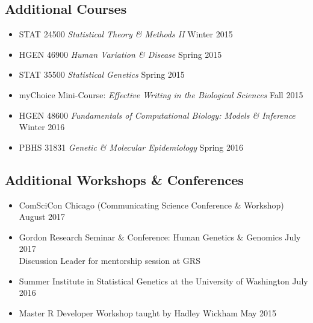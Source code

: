 \documentclass[a4paper, 11pt]{article}
\begin{document}
\subsection*{Additional Courses}
\begin{itemize}
    \item STAT 24500 \emph{Statistical Theory \& Methods II }\hfill Winter 2015
    \item HGEN 46900 \emph{Human Variation \& Disease} \hfill Spring 2015
    \item STAT 35500 \emph{Statistical Genetics} \hfill Spring 2015
    \item myChoice Mini-Course: \emph{Effective Writing in the Biological Sciences} \hfill Fall 2015
    \item HGEN 48600 \emph{Fundamentals of Computational Biology: Models \& Inference} \hfill Winter 2016
    \item PBHS 31831 \emph{Genetic \& Molecular Epidemiology} \hfill Spring 2016
  
	
\end{itemize}

\subsection*{Additional Workshops \& Conferences}
\begin{itemize}
	\item ComSciCon Chicago (Communicating Science Conference \& Workshop)  \hfill August 2017
	\item Gordon Research Seminar \& Conference: Human Genetics \& Genomics \hfill July 2017 \\ Discussion Leader for mentorship session at GRS
     \item Summer Institute in Statistical Genetics at the University of Washington \hfill July 2016
        \item Master R Developer Workshop taught by Hadley Wickham \hfill May 2015
\end{itemize}
\end{document}
